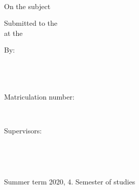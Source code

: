 
\begin{titlepage}
  \begin{center}
     \vspace*{-1cm}
     {\huge\bfseries\MakeUppercase\univname\par\vspace{2cm}} %
     {\large \degreename}\\[0.5cm] %

     \vfill

     On the subject\\
     \vspace{2cm}
     {\Large \bfseries \ttitle\par}\vspace{5cm} %

     {Submitted to the \facname \\at the \univname}\vspace{0.8cm} %

     \vspace{2cm}

     \begin{minipage}[t]{0.2\textwidth}
      \begin{flushleft} \large
       By:
      \end{flushleft}
     \end{minipage}
     \begin{minipage}[t]{0.75\textwidth}
      \begin{flushleft} \large
        \authorname\\
        \addressname\\
        \email\\
        Matriculation number: \matnumber
      \end{flushleft}
     \end{minipage}\\[1cm]

     \begin{minipage}[t]{0.2\textwidth}
      \begin{flushleft} \large
       Supervisors:
      \end{flushleft}
     \end{minipage}
     \begin{minipage}[t]{0.75\textwidth}
      \begin{flushleft} \large
        \supname\\
        \examname
      \end{flushleft}
     \end{minipage}\\[1cm]

     \vfill

     Summer term 2020, 4. Semester of studies
     \vfill
  \end{center}
\end{titlepage}